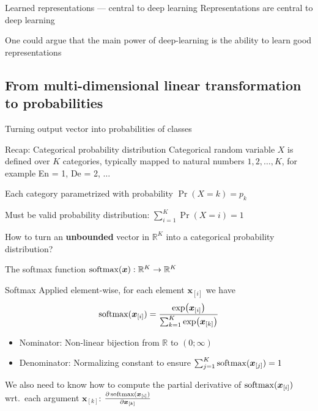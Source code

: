 \documentclass[12pt,aspectratio=169,handout]{beamer}
\begin{document}
\begin{frame}{Learned representations --- central to deep learning}
	Representations are central to deep learning
	
	One could argue that the main power of deep-learning is the ability to learn good representations
\end{frame}


\subsection{From multi-dimensional linear transformation to probabilities}

\begin{frame}{Turning output vector into probabilities of classes}
	
	\begin{block}{Recap: Categorical probability distribution}
		Categorical random variable $X$ is defined over $K$ categories, typically mapped to natural numbers $1, 2, \ldots, K$, for example En = 1, De = 2, $\ldots$
		
		\pause
		Each category parametrized with probability $\Pr(X = k) = p_k$
		
		\pause
		Must be valid probability distribution: $\sum_{i =1}^{K} \Pr(X = i) = 1$
	\end{block}
	
	\pause
	How to turn an \textbf{unbounded} vector in $\mathbb{R}^K$ into a categorical probability distribution?
	
\end{frame}

\begin{frame}{The softmax function $\operatorname*{soft\!\max} (\bm{x}): \mathbb{R}^K \to \mathbb{R}^K$}
	
	\begin{block}{Softmax}
		Applied element-wise, for each element $\bm{x}_{[i]}$ we have
		$$
		\operatorname*{soft\!\max} (\bm{x}_{[i]}) = \frac{\exp(\bm{x}_{[i]})}{
			\sum_{k=1}^{K} \exp(\bm{x}_{[k]})
		}
		$$
	\end{block}
	
	\pause
	\begin{itemize}
		\item Nominator: Non-linear bijection from $\mathbb{R}$ to $(0; \infty)$
		\item Denominator: Normalizing constant to ensure $\sum_{j = 1}^{K} \operatorname*{soft\!\max} (\bm{x}_{[j]}) = 1$
	\end{itemize}
	
	\pause
	We also need to know how to compute the partial derivative of $\operatorname*{soft\!\max} (\bm{x}_{[i]})$ wrt.\ each argument $\bm{x}_{[k]}$: $\pdv{\operatorname*{soft\!\max}(\bm{x}_{[i]})}{\bm{x}_{[k]}}$
	
\end{frame}
\end{document}
